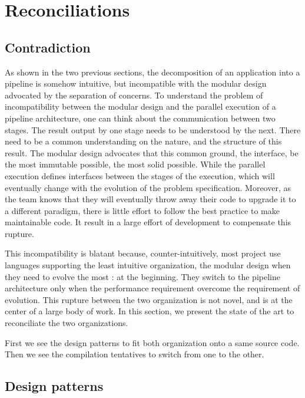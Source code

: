 \section{Reconciliations} \label{chapter4:reconciliations}

\subsection{Contradiction}

As shown in the two previous sections, the decomposition of an application into a pipeline is somehow intuitive, but incompatible with the modular design advocated by the separation of concerns.
To understand the problem of incompatibility between the modular design and the parallel execution of a pipeline architecture, one can think about the communication between two stages.
The result output by one stage needs to be understood by the next.
There need to be a common understanding on the nature, and the structure of this result.
The modular design advocates that this common ground, the interface, be the most immutable possible, the most solid possible.
While the parallel execution defines interfaces between the stages of the execution, which will eventually change with the evolution of the problem specification.
Moreover, as the team knows that they will eventually throw away their code to upgrade it to a different paradigm, there is little effort to follow the best practice to make maintainable code.
It result in a large effort of development to compensate this rupture.

This incompatibility is blatant because, counter-intuitively, most project use languages supporting the least intuitive organization, the modular design when they need to evolve the most : at the beginning.
They switch to the pipeline architecture only when the performance requirement overcome the requirement of evolution.
This rupture between the two organization is not novel, and is at the center of a large body of work.
In this section, we present the state of the art to reconciliate the two organizations.

First we see the design patterns to fit both organization onto a same source code.
Then we see the compilation tentatives to switch from one to the other.

\subsection{Design patterns}

